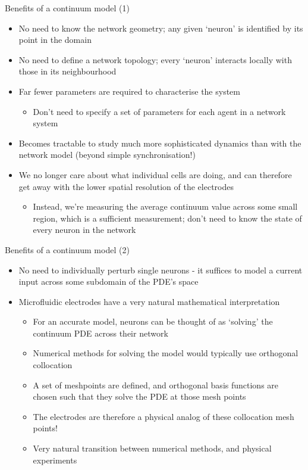 \documentclass[presentation]{beamer}
\begin{document}
\begin{frame}[label={sec:org9ccd615}]{Benefits of a continuum model (1)}
\begin{itemize}
\item No need to know the network geometry; any given `neuron' is identified by its point in the domain
\item No need to define a network topology; every `neuron' interacts locally with those in its neighbourhood
\item Far fewer parameters are required to characterise the system
\begin{itemize}
\item Don't need to specify a set of parameters for each agent in a network system
\end{itemize}
\item Becomes tractable to study much more sophisticated dynamics than with the network model (beyond simple synchronisation!)
\item We no longer care about what individual cells are doing, and can therefore get away with the lower spatial resolution of the electrodes
\begin{itemize}
\item Instead, we're measuring the average continuum value across some small region, which is a sufficient measurement; don't need to know the state of every neuron in the network
\end{itemize}
\end{itemize}
\end{frame}

\begin{frame}[label={sec:org72411ac}]{Benefits of a continuum model (2)}
\begin{itemize}
\item No need to individually perturb single neurons - it suffices to model a current input across some subdomain of the PDE's space
\item Microfluidic electrodes have a very natural mathematical interpretation
\begin{itemize}
\item For an accurate model, neurons can be thought of as `solving' the continuum PDE across their network
\item Numerical methods for solving the model would typically use orthogonal collocation
\item A set of meshpoints are defined, and orthogonal basis functions are chosen such that they solve the PDE at those mesh points
\item The electrodes are therefore a physical analog of these collocation mesh points!
\item Very natural transition between numerical methods, and physical experiments
\end{itemize}
\end{itemize}
\end{frame}
\end{document}
